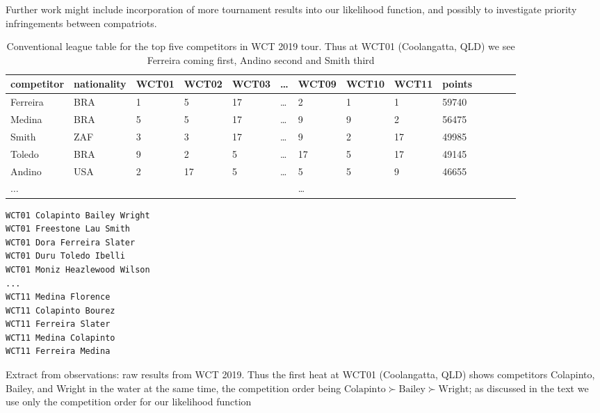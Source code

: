 \documentclass{article}
\begin{document}
Further work might include incorporation of more tournament results
into our likelihood function, and possibly to investigate priority
infringements between compatriots.




\clearpage
\newpage


\begin{table}[h]
\begin{tabular}{llllllllllllll}
competitor  & nationality&WCT01  &WCT02  &WCT03  & \ldots &WCT09&WCT10&WCT11&points\\ \hline
 Ferreira   &   BRA      &   1   &   5   &   17  & \ldots      &  2   &   1   &   1   &   59740\\
 Medina     &   BRA      &   5   &   5   &   17  & \ldots      &  9   &   9   &   2   &   56475\\
 Smith 	    &   ZAF      &   3   &   3   &   17  & \ldots      &  9   &   2   &   17  &   49985\\
 Toledo     &   BRA      &   9   &   2   &   5   & \ldots      &  17  &   5   &   17  &   49145\\
 Andino     &   USA      &   2   &   17  &   5   & \dots       &  5   &   5   &   9   &   46655\\
 $\ldots$   &            &   &   &       &       & \dots       &      &       &       &
\end{tabular}
\caption{Conventional league table for the top five competitors in WCT
  2019 tour. \label{resultstable} Thus at WCT01 (Coolangatta, QLD) we see
  Ferreira coming first, Andino second and Smith third}
\end{table}

\clearpage
\newpage


\begin{table}[h]
\begin{verbatim}
WCT01 Colapinto Bailey Wright
WCT01 Freestone Lau Smith
WCT01 Dora Ferreira Slater
WCT01 Duru Toledo Ibelli
WCT01 Moniz Heazlewood Wilson
...
WCT11 Medina Florence
WCT11 Colapinto Bourez
WCT11 Ferreira Slater
WCT11 Medina Colapinto
WCT11 Ferreira Medina
\end{verbatim}
\caption{Extract from observations: raw results\label{rawresults} from
  WCT 2019.  Thus the first heat at WCT01 (Coolangatta, QLD) shows
  competitors Colapinto, Bailey, and Wright in the water at the same
  time, the competition order being
  $\mbox{Colapinto}\succ\mbox{Bailey}\succ\mbox{Wright}$; as discussed
  in the text we use only the competition order for our likelihood
  function}
\end{table}
\end{document}
